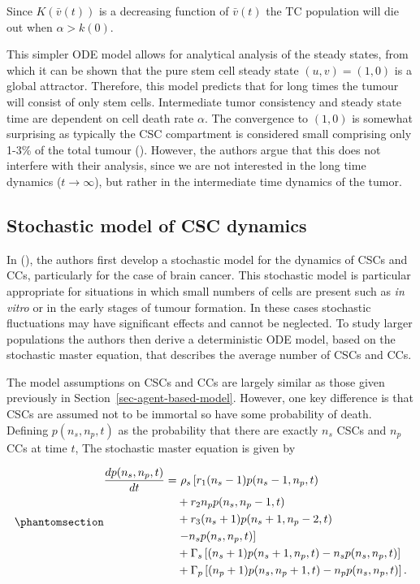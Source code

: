 \documentclass[
  letterpaper,
]{scrreprt}
\theoremstyle{definition}
\theoremstyle{remark}
\begin{document}
Since \(K(\bar{v}(t))\) is a decreasing function of \(\bar{v}(t)\) the
TC population will die out when \(\alpha > k(0)\).

This simpler ODE model allows for analytical analysis of the steady
states, from which it can be shown that the pure stem cell steady state
\((u,v)= (1,0)\) is a global attractor. Therefore, this model predicts
that for long times the tumour will consist of only stem cells.
Intermediate tumor consistency and steady state time are dependent on
cell death rate \(\alpha\). The convergence to \((1,0)\) is somewhat
surprising as typically the CSC compartment is considered small
comprising only 1-3\% of the total tumour (). However, the authors argue that this does not interfere with
their analysis, since we are not interested in the long time dynamics
(\(t \rightarrow \infty\)), but rather in the intermediate time dynamics
of the tumor.

\subsection{Stochastic model of CSC
dynamics}\label{sec-stochastic-model}

In (), the authors first
develop a stochastic model for the dynamics of CSCs and CCs,
particularly for the case of brain cancer. This stochastic model is
particular appropriate for situations in which small numbers of cells
are present such as \emph{in vitro} or in the early stages of tumour
formation. In these cases stochastic fluctuations may have significant
effects and cannot be neglected. To study larger populations the authors
then derive a deterministic ODE model, based on the stochastic master
equation, that describes the average number of CSCs and CCs.

The model assumptions on CSCs and CCs are largely similar as those given
previously in Section~\ref{sec-agent-based-model}. However, one key
difference is that CSCs are assumed not to be immortal so have some
probability of death. Defining \(p(n_s, n_p,t)\) as the probability that
there are exactly \(n_s\) CSCs and \(n_p\) CCs at time \(t\), The
stochastic master equation is given by

\begin{equation}\phantomsection\label{eq-stochastic-master-equation}{
\begin{aligned}
\frac{dp(n_s,n_p,t)}{dt} = & \ \rho_s \left[r_1 (n_s - 1) p(n_s - 1, n_p, t) \right. \\
& + r_2 n_p p(n_s, n_p - 1, t) \\
& + r_3 (n_s + 1) p(n_s + 1, n_p - 2, t) \\
& \left. - n_s p(n_s, n_p, t) \right] \\
& + \Gamma_s \left[ (n_s + 1) p(n_s + 1, n_p, t) - n_s p(n_s, n_p, t) \right] \\
& + \Gamma_p \left[ (n_p + 1) p(n_s, n_p + 1, t) - n_p p(n_s, n_p, t) \right].
\end{aligned}
}\end{equation}
\end{document}
